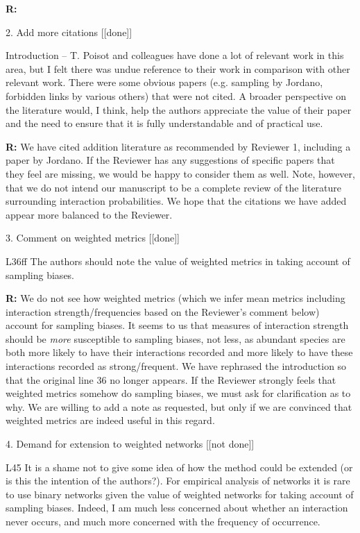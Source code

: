 \documentclass[12pt]{letter}
\newenvironment{refquote}{\bigskip \begin{it}}{\end{it}\smallskip}
\begin{document}
		\textbf{R:}


	2. Add more citations [[done]]

		\begin{refquote}
		Introduction – T. Poisot and colleagues have done a lot of relevant work in this area, but I felt there was undue reference to their work in comparison with other relevant work. There were some obvious papers (e.g. sampling by Jordano, forbidden links by various others) that were not cited. A broader perspective on the literature would, I think, help the authors appreciate the value of their paper and the need to ensure that it is fully understandable and of practical use.
		\end{refquote}

		\textbf{R:} We have cited addition literature as recommended by Reviewer 1, including a paper by Jordano. If the Reviewer has any suggestions of specific papers that they feel are missing, we would be happy to consider them as well. Note, however, that we do not intend our manuscript to be a complete review of the literature surrounding interaction probabilities. We hope that the citations we have added appear more balanced to the Reviewer.


	3. Comment on weighted metrics [[done]]

		\begin{refquote}
		L36ff The authors should note the value of weighted metrics in taking account of sampling biases.
		\end{refquote}

		\textbf{R:} We do not see how weighted metrics (which we infer mean metrics including interaction strength/frequencies based on the Reviewer's comment below) account for sampling biases. It seems to us that measures of interaction strength should be \emph{more} susceptible to sampling biases, not less, as abundant species are both more likely to have their interactions recorded and more likely to have these interactions recorded as strong/frequent. We have rephrased the introduction so that the original line 36 no longer appears. If the Reviewer strongly feels that weighted metrics somehow do sampling biases, we must ask for clarification as to why. We are willing to add a note as requested, but only if we are convinced that weighted metrics are indeed useful in this regard.


	4. Demand for extension to weighted networks [[not done]]

		\begin{refquote}
		L45 It is a shame not to give some idea of how the method could be extended (or is this the intention of the authors?). For empirical analysis of networks it is rare to use binary networks given the value of weighted networks for taking account of sampling biases. Indeed, I am much less concerned about whether an interaction never occurs, and much more concerned with the frequency of occurrence.
		\end{refquote}
\end{document}
